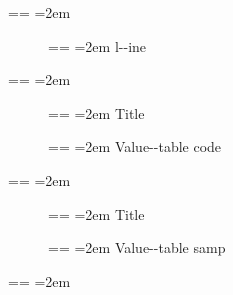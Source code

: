 \documentclass{book}
\makeatletter
\newcommand\GNUTexinfotablestyleemph[1]{{\normalfont\emph{#1}}}%
\newcommand\GNUTexinfotablestylesamp[1]{\ifstrempty{#1}{}{{`\texttt{#1}'}}}%
\newenvironment{GNUTexinfopreformatted}{%
  \par\obeylines\obeyspaces\frenchspacing
  \parskip=\z@\parindent=\z@}{}
\makeatother
\begin{document}
\begin{GNUTexinfopreformatted}
\leftskip=2em\relax\ttfamily%

\end{GNUTexinfopreformatted}
\begin{description}
\item[{\parbox[b]{\linewidth}{%
\GNUTexinfotablestyleemph{a}\\
\index[fn]{a@\texttt{a}}%
\index[cp]{index entry between item and itemx}%
\GNUTexinfotablestyleemph{b}
\index[fn]{b@\texttt{b}}%
}}]
\begin{GNUTexinfopreformatted}
\leftskip=2em\relax\ttfamily%
l{-}{-}ine
\end{GNUTexinfopreformatted}
\end{description}
\begin{GNUTexinfopreformatted}
\leftskip=2em\relax\ttfamily%

\end{GNUTexinfopreformatted}
\begin{description}
\item[] \begin{GNUTexinfopreformatted}
\leftskip=2em\relax\ttfamily%
Title
\end{GNUTexinfopreformatted}
\item[{\parbox[b]{\linewidth}{%
\texttt{a{-}{-}code}}}]
\begin{GNUTexinfopreformatted}
\leftskip=2em\relax\ttfamily%
Value{-}{-}table code
\end{GNUTexinfopreformatted}
\end{description}
\begin{GNUTexinfopreformatted}
\leftskip=2em\relax\ttfamily%

\end{GNUTexinfopreformatted}
\begin{description}
\item[] \begin{GNUTexinfopreformatted}
\leftskip=2em\relax\ttfamily%
Title
\end{GNUTexinfopreformatted}
\item[{\parbox[b]{\linewidth}{%
\GNUTexinfotablestylesamp{a{-}{-}samp}\\
\GNUTexinfotablestylesamp{a2{-}{-}samp}}}]
\begin{GNUTexinfopreformatted}
\leftskip=2em\relax\ttfamily%
Value{-}{-}table samp
\end{GNUTexinfopreformatted}
\end{description}
\begin{GNUTexinfopreformatted}
\leftskip=2em\relax\ttfamily%

\end{GNUTexinfopreformatted}
\end{document}
